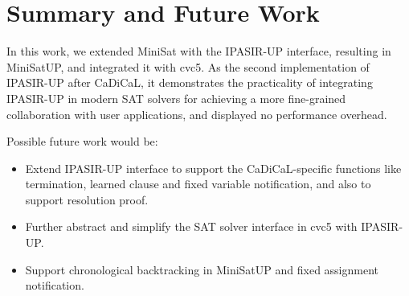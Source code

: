 \chapter{Summary and Future Work}

In this work, we extended MiniSat with the IPASIR-UP interface, resulting in MiniSatUP, and integrated it with cvc5. As the second implementation of IPASIR-UP after CaDiCaL, it demonstrates the practicality of integrating IPASIR-UP in modern SAT solvers for achieving a more fine-grained collaboration with user applications, and displayed no performance overhead.

Possible future work would be:

\begin{itemize}
  \item Extend IPASIR-UP interface to support the CaDiCaL-specific functions like termination, learned clause and fixed variable notification, and also to support resolution proof.
  \item Further abstract and simplify the SAT solver interface in cvc5 with IPASIR-UP.
  \item Support chronological backtracking in MiniSatUP and fixed assignment notification.
\end{itemize}
